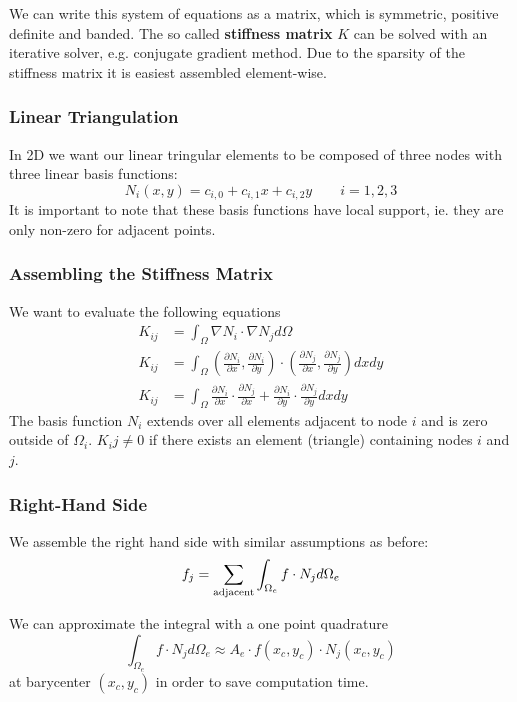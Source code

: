 \documentclass{article}
\begin{document}
We can write this system of equations as a matrix, which is symmetric, positive definite and banded.
The so called \textbf{stiffness matrix} $K$ can be solved with an iterative solver, e.g. conjugate gradient method.
Due to the sparsity of the stiffness matrix it is easiest assembled element-wise.

\subsubsection{Linear Triangulation}
In 2D we want our linear tringular elements to be composed of three nodes with three linear basis functions:
\begin{equation}
    N_i(x,y) = c_{i,0} + c_{i,1} x + c_{i,2}y \qquad i=1,2,3
\end{equation}
It is important to note that these basis functions have local support, ie. they are only non-zero for adjacent points.

\subsubsection{Assembling the Stiffness Matrix}
We want to evaluate the following equations
\begin{align}
    K_{ij} &= \int_\Omega \nabla N_i \cdot \nabla N_j d\Omega\\
    K_{ij} &= \int_\Omega (\frac{\partial N_i}{\partial x}, \frac{\partial N_i}{\partial y}) \cdot (\frac{\partial N_j}{\partial x}, \frac{\partial N_j}{\partial y}) dxdy\\
    K_{ij} &= \int_\Omega \frac{\partial N_i}{\partial x} \cdot \frac{\partial N_j}{\partial x} + \frac{\partial N_i}{\partial y} \cdot \frac{\partial N_j}{\partial y} dxdy
\end{align}
The basis function $N_i$ extends over all elements adjacent to node $i$ and is zero outside of $\Omega_i$.
$K_ij \neq 0$ if there exists an element (triangle) containing nodes $i$ and $j$.

\subsubsection{Right-Hand Side}
We assemble the right hand side with similar assumptions as before:
\begin{equation}
    f_j = \sum_{\textup{adjacent}} \int_{\Omega_e} f \cdot N_j d\Omega_e
\end{equation}

We can approximate the integral with a one point quadrature
\begin{equation}
    \int_{\Omega_e} f \cdot N_j d\Omega_e \approx A_e \cdot f(x_c, y_c) \cdot N_j(x_c, y_c)
\end{equation}
at barycenter $(x_c, y_c)$ in order to save computation time.
\end{document}
